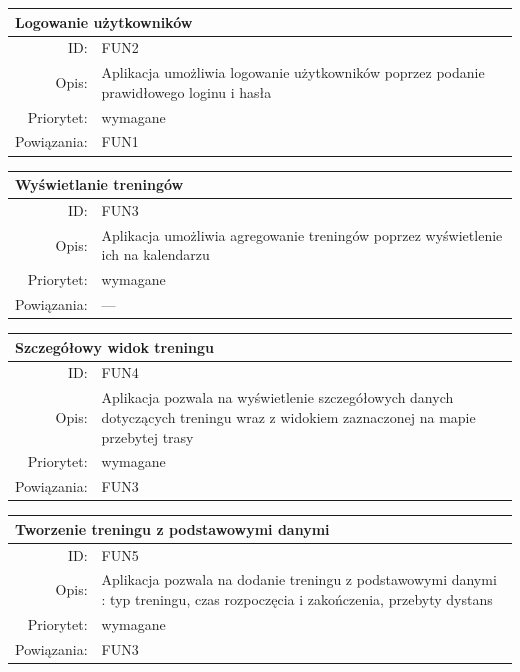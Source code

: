 \begin{center}
      \begin{tabular}{rp{10cm}}
	      \multicolumn{2}{l}{\textbf{Logowanie użytkowników}} \\
	      \hline
	      ID: & FUN2 \\
	      Opis: & Aplikacja umożliwia logowanie użytkowników poprzez podanie prawidłowego loginu i hasła \\
	      Priorytet: & wymagane \\
	      Powiązania: & FUN1 \\
    \end{tabular}
\end{center}

\begin{center}
      \begin{tabular}{rp{10cm}}
	      \multicolumn{2}{l}{\textbf{Wyświetlanie treningów}} \\
	      \hline
	      ID: & FUN3 \\
	      Opis: & Aplikacja umożliwia agregowanie treningów poprzez wyświetlenie ich na kalendarzu \\
	      Priorytet: & wymagane \\
	      Powiązania: & --- \\
    \end{tabular}
\end{center}

\begin{center}
      \begin{tabular}{rp{10cm}}
	      \multicolumn{2}{l}{\textbf{Szczegółowy widok treningu}} \\
	      \hline
	      ID: & FUN4 \\
	      Opis: & Aplikacja pozwala na wyświetlenie szczegółowych danych dotyczących treningu wraz z widokiem zaznaczonej na mapie przebytej trasy \\
	      Priorytet: & wymagane \\
	      Powiązania: & FUN3\\
    \end{tabular}
\end{center}

\begin{center}
      \begin{tabular}{rp{10cm}}
	      \multicolumn{2}{l}{\textbf{Tworzenie treningu z podstawowymi danymi}} \\
	      \hline
	      ID: & FUN5 \\
	      Opis: & Aplikacja pozwala na dodanie treningu z podstawowymi danymi : typ treningu, czas rozpoczęcia i zakończenia,	 przebyty dystans \\
	      Priorytet: & wymagane \\
	      Powiązania: & FUN3 \\
    \end{tabular}
\end{center}

